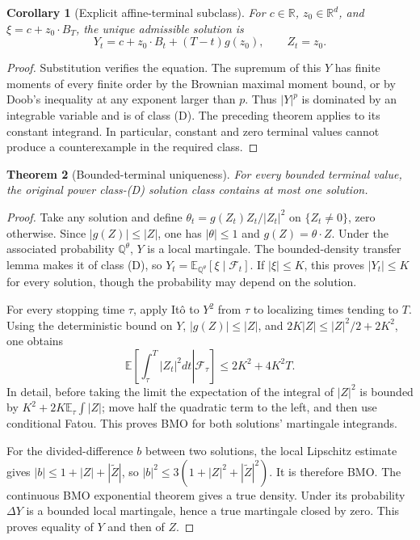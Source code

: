 \documentclass[11pt,a4paper]{article}
\newcommand{\R}{\mathbb R}
\newcommand{\E}{\mathbb E}
\newcommand{\Q}{\mathbb Q}
\newcommand{\F}{\mathcal F}
\newtheorem{theorem}{Theorem}
\newtheorem{corollary}[theorem]{Corollary}
\theoremstyle{definition}
\begin{document}
\begin{corollary}[Explicit affine-terminal subclass]
For $c\in\R$, $z_0\in\R^d$, and $\xi=c+z_0\cdot B_T$, the unique admissible solution is
\[
 Y_t=c+z_0\cdot B_t+(T-t)g(z_0),\qquad Z_t=z_0.
\]
\end{corollary}
\begin{proof}
Substitution verifies the equation. The supremum of this $Y$ has finite moments of every finite order by the Brownian maximal moment bound, or by Doob's inequality at any exponent larger than $p$. Thus $|Y|^p$ is dominated by an integrable variable and is of class (D). The preceding theorem applies to its constant integrand. In particular, constant and zero terminal values cannot produce a counterexample in the required class.
\end{proof}

\begin{theorem}[Bounded-terminal uniqueness]
For every bounded terminal value, the original power class-(D) solution class contains at most one solution.
\end{theorem}
\begin{proof}
Take any solution and define
$\theta_t=g(Z_t)Z_t/|Z_t|^2$ on $\{Z_t\ne0\}$, zero otherwise. Since $|g(Z)|\le|Z|$, one has $|\theta|\le1$ and $g(Z)=\theta\cdot Z$. Under the associated probability $\Q^\theta$, $Y$ is a local martingale. The bounded-density transfer lemma makes it of class (D), so
$Y_t=\E_{\Q^\theta}[\xi\mid\F_t]$.
If $|\xi|\le K$, this proves $|Y_t|\le K$ for every solution, though the probability may depend on the solution.

For every stopping time $\tau$, apply It\^o to $Y^2$ from $\tau$ to localizing times tending to $T$. Using the deterministic bound on $Y$, $|g(Z)|\le|Z|$, and
$2K|Z|\le|Z|^2/2+2K^2$, one obtains
\[
 \E\left[\left.\int_\tau^T|Z_t|^2dt\right|\F_\tau\right]
 \le2K^2+4K^2T.
\]
In detail, before taking the limit the expectation of the integral of $|Z|^2$ is bounded by $K^2+2K\E_\tau\int|Z|$; move half the quadratic term to the left, and then use conditional Fatou. This proves BMO for both solutions' martingale integrands.

For the divided-difference $b$ between two solutions, the local Lipschitz estimate gives
$|b|\le1+|Z|+|\widetilde Z|$, so
$|b|^2\le3(1+|Z|^2+|\widetilde Z|^2)$.
It is therefore BMO. The continuous BMO exponential theorem gives a true density. Under its probability $\Delta Y$ is a bounded local martingale, hence a true martingale closed by zero. This proves equality of $Y$ and then of $Z$.
\end{proof}
\end{document}
